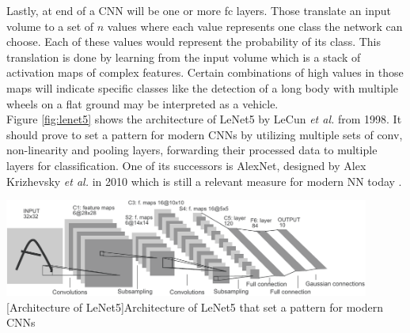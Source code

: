 Lastly, at end of a \ac{CNN} will be one or more \ac{fc} layers. Those translate an input volume to a set of $n$ values where each value represents one class the network can choose. Each of these values would represent the probability of its class. This translation is done by learning from the input volume which is a stack of activation maps of complex features. Certain combinations of high values in those maps will indicate specific classes like the detection of a long body with multiple wheels on a flat ground may be interpreted as a vehicle.\\
Figure \ref{fig:lenet5} shows the architecture of LeNet5 by LeCun \textit{et al.} \cite{Lecun98gradient-basedlearning} from 1998. It should prove to set a pattern for modern \acp{CNN} by utilizing multiple sets of \ac{conv}, non-linearity and pooling layers, forwarding their processed data to multiple layers for classification. One of its successors is AlexNet, designed by Alex Krizhevsky \textit{et al.} in 2010 \cite{NIPS2012_4824} which is still a relevant measure for modern \ac{NN} today \cite{DBLP:journals/corr/CanzianiPC16}.

\begin{center}
\noindent\includegraphics[width=12cm]{tex/img/ch03/LeNet5.pdf}
[Architecture of LeNet5]{Architecture of LeNet5 that set a pattern for modern \acp{CNN} \cite{Lecun98gradient-basedlearning}}
\label{fig:lenet5}
\end{center}

